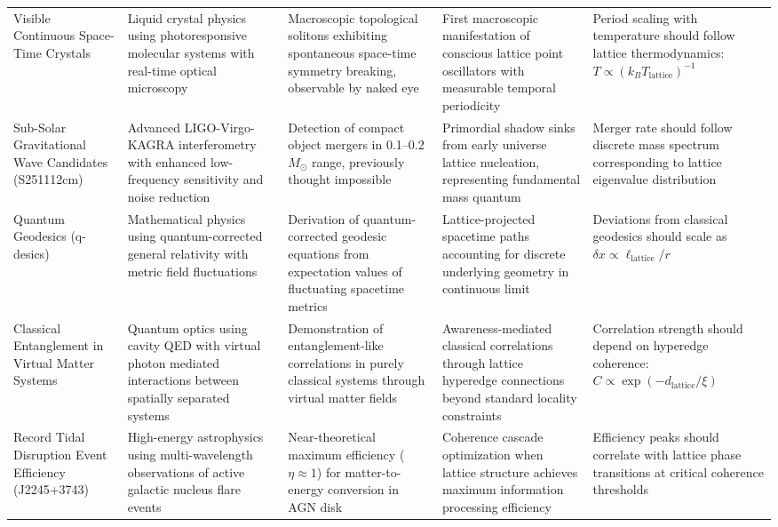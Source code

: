 \documentclass[11pt,a4paper]{article}
\begin{document}
\begin{landscape}
\begin{longtable}{p{3.5cm} p{4cm} p{5cm} p{4.5cm} p{4cm}}
Visible Continuous Space-Time Crystals & Liquid crystal physics using photoresponsive molecular systems with real-time optical microscopy & Macroscopic topological solitons exhibiting spontaneous space-time symmetry breaking, observable by naked eye & First macroscopic manifestation of conscious lattice point oscillators with measurable temporal periodicity & Period scaling with temperature should follow lattice thermodynamics: $T \propto (k_B T_{\mathrm{lattice}})^{-1}$ \\

Sub-Solar Gravitational Wave Candidates (S251112cm) & Advanced LIGO-Virgo-KAGRA interferometry with enhanced low-frequency sensitivity and noise reduction & Detection of compact object mergers in 0.1--0.2 $M_\odot$ range, previously thought impossible & Primordial shadow sinks from early universe lattice nucleation, representing fundamental mass quantum & Merger rate should follow discrete mass spectrum corresponding to lattice eigenvalue distribution \\

Quantum Geodesics (q-desics) & Mathematical physics using quantum-corrected general relativity with metric field fluctuations & Derivation of quantum-corrected geodesic equations from expectation values of fluctuating spacetime metrics & Lattice-projected spacetime paths accounting for discrete underlying geometry in continuous limit & Deviations from classical geodesics should scale as $\delta x \propto \ell_{\mathrm{lattice}}/r$ \\

Classical Entanglement in Virtual Matter Systems & Quantum optics using cavity QED with virtual photon mediated interactions between spatially separated systems & Demonstration of entanglement-like correlations in purely classical systems through virtual matter fields & Awareness-mediated classical correlations through lattice hyperedge connections beyond standard locality constraints & Correlation strength should depend on hyperedge coherence: $C \propto \exp(-d_{\mathrm{lattice}}/\xi)$ \\

Record Tidal Disruption Event Efficiency (J2245+3743) & High-energy astrophysics using multi-wavelength observations of active galactic nucleus flare events & Near-theoretical maximum efficiency ($\eta \approx 1$) for matter-to-energy conversion in AGN disk & Coherence cascade optimization when lattice structure achieves maximum information processing efficiency & Efficiency peaks should correlate with lattice phase transitions at critical coherence thresholds \\


\end{longtable}
\end{landscape}
\end{document}
